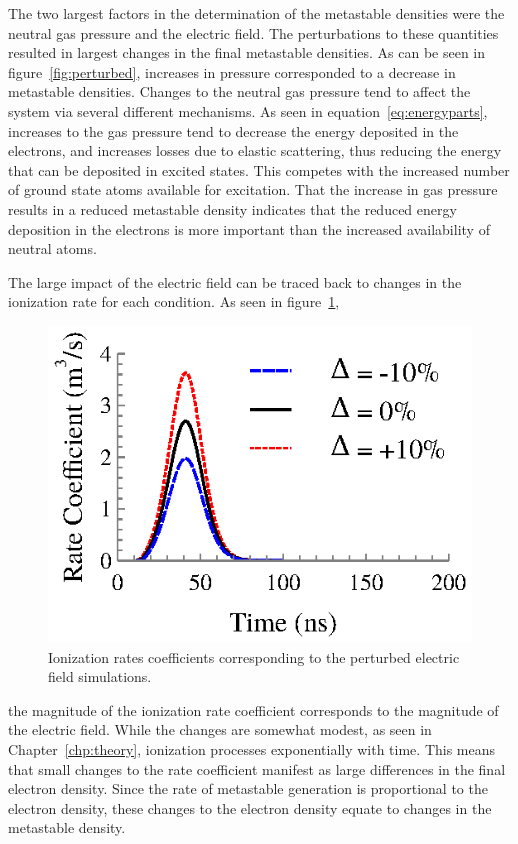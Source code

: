 The two largest factors in the determination of the metastable densities were
the neutral gas pressure and the electric field. The perturbations to these
quantities resulted in largest changes in the final metastable densities. As can
be seen in figure~\ref{fig:perturbed}, increases in pressure corresponded to a
decrease in metastable densities. Changes to the neutral gas pressure tend to
affect the system via several different mechanisms. As seen in
equation~\ref{eq:energyparts}, increases to the gas pressure tend to decrease
the energy deposited in the electrons, and increases losses due to elastic
scattering, thus reducing the energy that can be deposited in excited states.
This competes with the increased number of ground state atoms available for
excitation. That the increase in gas pressure results in a reduced metastable
density indicates that the reduced energy deposition in the electrons is more
important than the increased availability of neutral atoms.

The large impact of the electric field can be traced back to changes in the
ionization rate for each condition. As seen in figure~\ref{fig:ionrates},
\begin{figure}
  \centering
  \includegraphics{./chapters/modeling/figures/ionrates.eps}
  \caption{Ionization rates coefficients corresponding to the perturbed electric
  field simulations.}
  \label{fig:ionrates}
\end{figure}
the magnitude of the ionization rate coefficient corresponds to the magnitude of
the electric field. While the changes are somewhat modest, as seen in
Chapter~\ref{chp:theory}, ionization processes exponentially with time. This
means that small changes to the rate coefficient manifest as large differences
in the final electron density. Since the rate of metastable generation is
proportional to the electron density, these changes to the electron density
equate to changes in the metastable density.

